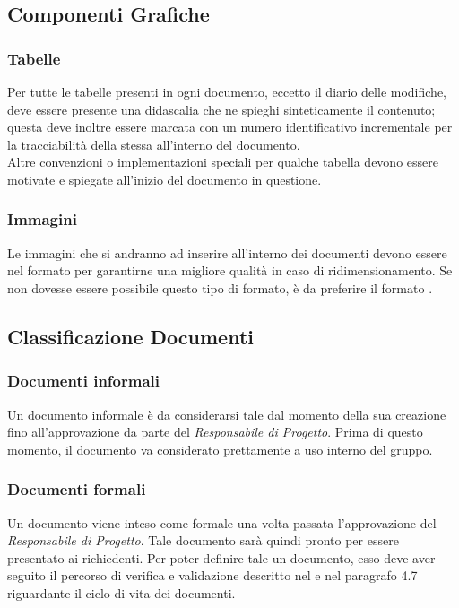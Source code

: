 \subsection{Componenti Grafiche}
\subsubsection{Tabelle}
Per tutte le tabelle presenti in ogni documento, eccetto il diario delle modifiche, deve essere presente una didascalia che ne spieghi sinteticamente il contenuto; questa deve inoltre essere marcata con un numero identificativo incrementale per la tracciabilità della stessa all'interno del documento. \\
Altre convenzioni o implementazioni speciali per qualche tabella devono essere motivate e spiegate all'inizio del documento in questione.

\subsubsection{Immagini}
Le immagini che si andranno ad inserire all'interno dei documenti devono essere nel formato  per garantirne una migliore qualità in caso di ridimensionamento. Se non dovesse essere possibile questo tipo di formato, è da preferire il formato .


\subsection{Classificazione Documenti}
\subsubsection{Documenti informali}
Un documento informale è da considerarsi tale dal momento della sua creazione fino all'approvazione da parte del \textit{Responsabile di Progetto}. Prima di questo momento, il documento va considerato prettamente a uso interno del gruppo.

\subsubsection{Documenti formali}
Un documento viene inteso come formale una volta passata l'approvazione del \textit{Responsabile di Progetto}. Tale documento sarà quindi pronto per essere presentato ai richiedenti. Per poter definire tale un documento, esso deve aver seguito il percorso di verifica e validazione descritto nel \PianoDiQualifica{} e nel paragrafo 4.7 riguardante il ciclo di vita dei documenti.

